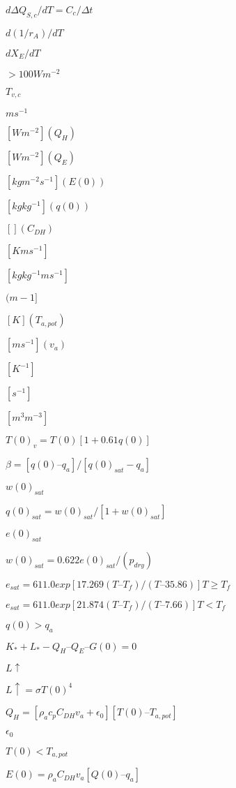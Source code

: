 \documentclass{article}
\begin{document}
{$d \Delta Q_{S,c} /dT = C_c / \Delta t$
\pagebreak

$d(1/r_A )/dT$
\pagebreak

$dX_E /dT$
\pagebreak

$> 100 W m^{-2}$
\pagebreak

$T_{v,c}$
\pagebreak

$m s^{-1}$
\pagebreak

$[W m^{-2}] (Q_H )$
\pagebreak

$[W m^{-2}] (Q_E)$
\pagebreak

$[kg m^{-2} s^{-1}] (E(0))$
\pagebreak

$[kg kg^{-1}] (q(0))$
\pagebreak

$[ ] (C_{DH}) $
\pagebreak

$[K m s^{-1}]$
\pagebreak

$[kg kg^{-1} m s^{-1}]$
\pagebreak

$(m-1]$
\pagebreak

$[K] (T_{a,pot})$
\pagebreak

$[m s^{-1}] (v_a)$
\pagebreak

$[K^{-1}]$
\pagebreak

$[s^{-1}]$
\pagebreak

$[m^{3} m^{-3}]$
\pagebreak

$T(0)_v = T(0) [1 + 0.61 q(0)]$
\pagebreak

$\beta = [q(0) – q_a]/[q(0)_{sat} - q_a]$
\pagebreak

$w(0)_{sat}$
\pagebreak

$q(0)_{sat} = w(0)_{sat}/[1 + w(0)_{sat}]$
\pagebreak

$e(0)_{sat}$
\pagebreak

$w(0)_{sat} = 0.622 e(0)_{sat}/(p_{dry})$
\pagebreak

$e_{sat} = 611.0 exp[17.269 (T – T_f)/(T – 35.86)] T \geq T_f$
\pagebreak

$e_{sat} = 611.0 exp[21.874 (T – T_f)/(T – 7.66)] T < T_f$
\pagebreak

$q(0) > q_a$
\pagebreak

$K_* + L_* - Q_H – Q_E – G(0) = 0$
\pagebreak

$L \uparrow$
\pagebreak

$L \uparrow = \sigma T(0)^4$
\pagebreak

$Q_H = [\rho_a c_p C_{DH} v_a + \epsilon_0] [T(0) – T_{a,pot}]$
\pagebreak

$\epsilon_0$
\pagebreak

$T(0) < T_{a,pot}$
\pagebreak

$E(0) = \rho_a C_{DH} v_a [Q(0) – q_a]$
\pagebreak

}
\end{document}
